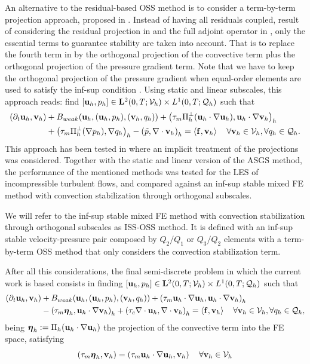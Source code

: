 An alternative to the residual-based OSS method is to consider a term-by-term projection approach, proposed in \cite{codina_analysis_2008}. Instead of having all residuals coupled, result of considering the residual projection in  and the full adjoint operator in , only the essential terms to guarantee stability are taken into account. That is to replace the fourth term in  by the orthogonal projection of the convective term plus the orthogonal projection of the pressure gradient term. Note that we have to keep the orthogonal projection of the pressure gradient when equal-order elements are used to satisfy the inf-sup condition . Using static and linear subscales, this approach reads: find 
$[{\bf u}_h,p_h]\in\mathbf{L}^2(0,T;\mathcal{V}_{h})\times L^1(0,T;\mathcal{Q}_{h})$ such that
\begin{align}
\label{eq-C7_NS_vms_tbtoss}
(\partial_t{\bf u}_h,{\bf v}_h)&+B_{weak}({\bf u}_h,({\bf u}_h,p_h),({\bf v}_h,q_h))+\left(\tau_m\Pi_h^\perp({\bf u}_h\cdot\nabla{\bf u}_h),{\bf u}_h\cdot\nabla{\bf v}_h\right)_h\\\nonumber
&+\left(\tau_m\Pi_h^\perp(\nabla p_h),\nabla q_h\right)_h-\left(\tilde{p},\nabla\cdot{\bf v}_h\right)_h=\left<{\bf f},{\bf v}_h\right>
\quad\forall{\bf v}_h\in\mathcal{V}_{h},\forall q_h\in\mathcal{Q}_{h}.
\end{align}
This approach has been tested in  where an implicit treatment of the projections was considered. Together with the static and linear version of the ASGS method, the performance of the mentioned methods was tested for the LES of incompressible turbulent flows, and compared against an inf-sup stable mixed FE method with convection stabilization through orthogonal subscales.

We will refer to the inf-sup stable mixed FE method with convection stabilization through orthogonal subscales as ISS-OSS method. It is defined with an inf-sup stable velocity-pressure pair composed by $ Q_2/Q_1 $ or $ Q_3/Q_2 $ elements with a term-by-term OSS method that only considers the convection stabilization term.

After all this considerations, the final semi-discrete problem in which the current work is based consists in finding 
$[{\bf u}_h,p_h]\in\mathbf{L}^2(0,T;\mathcal{V}_{h})\times L^1(0,T;\mathcal{Q}_{h})$ such that
\begin{align}
\label{eq-C7_NS_vms_mfe_oss}
(\partial_t{\bf u}_h,{\bf v}_h)&+B_{weak}({\bf u}_h,({\bf u}_h,p_h),({\bf v}_h,q_h))+\left(\tau_m{\bf u}_h\cdot\nabla{\bf u}_h,{\bf u}_h\cdot\nabla{\bf v}_h\right)_h\\\nonumber
&-\left(\tau_m\boldsymbol{\eta}_h,{\bf u}_h\cdot\nabla{\bf v}_h\right)_h+\left(\tau_c\nabla\cdot{\bf u}_h,\nabla\cdot{\bf v}_h\right)_h=\left<{\bf f},{\bf v}_h\right>
\quad\forall{\bf v}_h\in\mathcal{V}_{h},\forall q_h\in\mathcal{Q}_{h},
\end{align}
being $ \boldsymbol{\eta}_h:=\Pi_h({\bf u}_h\cdot\nabla{\bf u}_h) $ the projection of the convective term into the FE space, satisfying
\begin{equation}
\label{eq-C7_NS_projection}
\left(\tau_m\boldsymbol{\eta}_h,{\bf v}_h\right)=\left(\tau_m{\bf u}_h\cdot\nabla{\bf u}_h,{\bf v}_h\right)\quad\forall{\bf v}_h\in\mathcal{V}_{h}
\end{equation}

